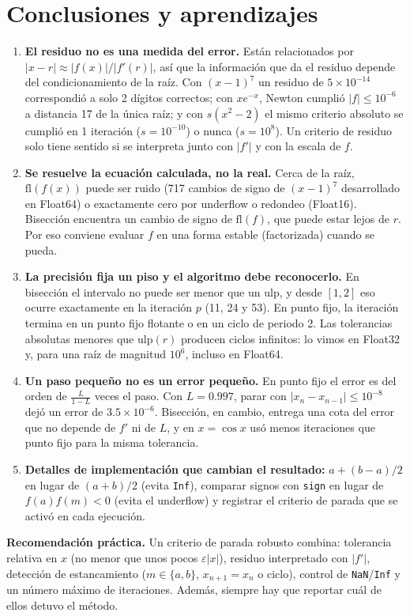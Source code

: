 \documentclass[11pt]{article}
\begin{document}
\section{Conclusiones y aprendizajes}
\begin{enumerate}
\item \textbf{El residuo no es una medida del error.} Están relacionados por $|x-r|\approx|f(x)|/|f'(r)|$, así que la información que da el residuo depende del condicionamiento de la raíz. Con $(x-1)^7$ un residuo de $5\times10^{-14}$ correspondió a solo 2 dígitos correctos; con $xe^{-x}$, Newton cumplió $|f|\le10^{-6}$ a distancia 17 de la única raíz; y con $s(x^2-2)$ el mismo criterio absoluto se cumplió en 1 iteración ($s=10^{-10}$) o nunca ($s=10^{8}$). Un criterio de residuo solo tiene sentido si se interpreta junto con $|f'|$ y con la escala de $f$.
\item \textbf{Se resuelve la ecuación calculada, no la real.} Cerca de la raíz, $\mathrm{fl}(f(x))$ puede ser ruido (717 cambios de signo de $(x-1)^7$ desarrollado en Float64) o exactamente cero por underflow o redondeo (Float16). Bisección encuentra un cambio de signo de $\mathrm{fl}(f)$, que puede estar lejos de $r$. Por eso conviene evaluar $f$ en una forma estable (factorizada) cuando se pueda.
\item \textbf{La precisión fija un piso y el algoritmo debe reconocerlo.} En bisección el intervalo no puede ser menor que un ulp, y desde $[1,2]$ eso ocurre exactamente en la iteración $p$ (11, 24 y 53). En punto fijo, la iteración termina en un punto fijo flotante o en un ciclo de periodo 2. Las tolerancias absolutas menores que $\mathrm{ulp}(r)$ producen ciclos infinitos: lo vimos en Float32 y, para una raíz de magnitud $10^6$, incluso en Float64.
\item \textbf{Un paso pequeño no es un error pequeño.} En punto fijo el error es del orden de $\frac{L}{1-L}$ veces el paso. Con $L=0.997$, parar con $|x_n-x_{n-1}|\le10^{-8}$ dejó un error de $3.5\times10^{-6}$. Bisección, en cambio, entrega una cota del error que no depende de $f'$ ni de $L$, y en $x=\cos x$ usó menos iteraciones que punto fijo para la misma tolerancia.
\item \textbf{Detalles de implementación que cambian el resultado:} $a+(b-a)/2$ en lugar de $(a+b)/2$ (evita \texttt{Inf}), comparar signos con \texttt{sign} en lugar de $f(a)f(m)<0$ (evita el underflow) y registrar el criterio de parada que se activó en cada ejecución.
\end{enumerate}
\textbf{Recomendación práctica.} Un criterio de parada robusto combina: tolerancia relativa en $x$ (no menor que unos pocos $\varepsilon|x|$), residuo interpretado con $|f'|$, detección de estancamiento ($m\in\{a,b\}$, $x_{n+1}=x_n$ o ciclo), control de \texttt{NaN}/\texttt{Inf} y un número máximo de iteraciones. Además, siempre hay que reportar cuál de ellos detuvo el método.
\end{document}
